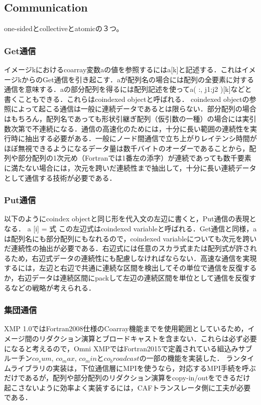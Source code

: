 \subsection{Communication}

one-sidedとcollectiveとatomicの３つ。

\subsubsection{Get通信}

イメージkにおけるcoarray変数aの値を参照するにはa[k]と記述する．これはイメージkからのGet通信を引き起こす．aが配列名の場合には配列の全要素に対する通信を意味する．aの部分配列を得るには配列記述を使ってa( :, j1:j2 )[k]などと書くこともできる．これらはcoindexed objectと呼ばれる．
coindexed objectの参照によって起こる通信は一般に連続データであるとは限らない．部分配列の場合はもちろん，配列名であっても形状引継ぎ配列（仮引数の一種）の場合には実引数次第で不連続になる．通信の高速化のためには，十分に長い範囲の連続性を実行時に抽出する必要がある．一般にノード間通信で立ち上がりレイテンシ時間がほぼ無視できるようになるデータ量は数千バイトのオーダーであることから，配列や部分配列の1次元め（Fortranでは1番左の添字）が連続であっても数千要素に満たない場合には，次元を跨いだ連続性まで抽出して，十分に長い連続データとして通信する技術が必要である．

\subsubsection{Put通信}

以下のようにcoindex objectと同じ形を代入文の左辺に書くと，Put通信の表現となる．
      a [i] = 式
この左辺式はcoindexed variableと呼ばれる．Get通信と同様，aは配列名にも部分配列にもなれるので，coindexed variableについても次元を跨いだ連続性の抽出が必要である．右辺式には任意のスカラ式または配列式が許されるため，右辺式データの連続性にも配慮しなければならない．高速な通信を実現するには，左辺と右辺で共通に連続な区間を検出してその単位で通信を反復するか，右辺データは連続区間にpackして左辺の連続区間を単位として通信を反復するなどの戦略が考えられる．

\subsubsection{集団通信}

XMP 1.0ではFortran2008仕様のCoarray機能までを使用範囲としているため，イメージ間のリダクション演算とブロードキャストを含まない．これらは必ず必要になると考えるので，Omni XMPではFortran2015で定義されている組込みサブルーチン$co_sum$, $co_max$, $co_min$と$co_broadcast$の一部の機能を実装した．
ランタイムライブラリの実装は，下位通信層にMPIを使うなら，対応するMPI手続を呼ぶだけであるが，配列や部分配列のリダクション演算をcopy-in/outをできるだけ起こさないように効率よく実装するには，CAFトランスレータ側に工夫が必要である．





